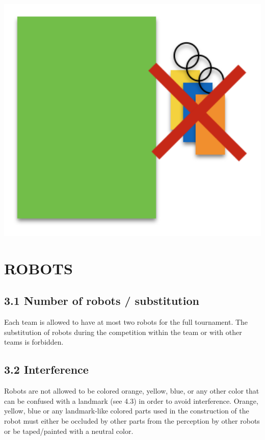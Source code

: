 \documentclass{article}
\begin{document}
\includegraphics[width=1\textwidth]{media/image2.png}

\section{ROBOTS\label{ref-018}}

\subsection{3.1 Number of robots / substitution \label{ref-019}}

Each team is allowed to have at most two robots \textcolor{color-5}{for the full} \textcolor{color-5}{tournament}. The substitution of robots during the competition within the team or with other teams is forbidden.

\subsection{3.2 Interference \label{ref-020}}

Robots are not allowed to be colored orange, yellow, blue\textcolor{color-5}{, or any other color that can be confused with a landmark (see 4.3)} in order to avoid interference. Orange, yellow, blue \textcolor{color-5}{or any landmark-like colored} parts used in the construction of the robot must either be occluded by other parts from the perception by other robots or be taped/painted with a neutral color. 
\end{document}
